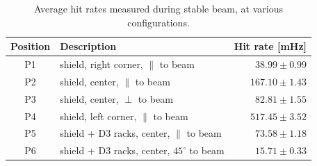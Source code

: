\begin{table}
\begin{center}
\begin{tabular}{c|l|r}
  Position & \hspace{0.9cm}Description & Hit rate [mHz] \\
  \hline \hline
   P1 & shield, right corner, $\parallel$ to beam & $ 38.99 \pm 0.99 $\\ \hline
   P2 & shield, center, $\parallel$ to beam& $ 167.10 \pm 1.43$ \\ \hline
   P3 & shield, center, $\perp$ to beam& $ 82.81 \pm 1.55 $ \\ \hline
   P4 & shield, left corner, $\parallel$ to beam& $ 517.45 \pm 3.52 $ \\ \hline
   P5 & shield + D3 racks, center, $\parallel$ to beam& $ 73.58 \pm 1.18 $ \\ \hline
   P6 & shield + D3 racks, center, $45^\circ$ to beam& $ 15.71 \pm 0.33 $ \\ \hline
\end{tabular}
\caption{\label{table:rate_stable_beam}
    Average hit rates measured during stable beam, at various configurations.
}
\end{center}
\end{table}





